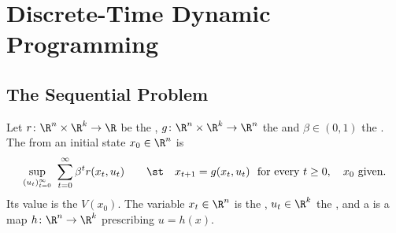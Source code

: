
\chapter{Discrete-Time Dynamic Programming}
\label{ch:dynamic}

\section{The Sequential Problem}\label{sec:dyn-sequential}

\begin{definition}\label{def:sequential-problem}
	Let $r\colon\R^{n}\times\R^{k}\to\R$ be the , $g\colon\R^{n}\times\R^{k}\to\R^{n}$ the  and $\beta\in(0,1)$ the . The 
	from an initial state $x_0\in\R^{n}$ is
	\begin{equation}\label{eq:sequential-problem}
		\sup_{(u_t)_{t=0}^{\infty}}\ \sum_{t=0}^{\infty}\beta^{t}r(x_t,u_t)
		\qquad\st\quad
		x_{t+1}=g(x_t,u_t)\ \text{ for every }t\geq0,\quad x_0\ \text{given}.
	\end{equation}
	Its value is the 
	$V(x_0)$. The variable $x_t\in\R^{n}$ is the , $u_t\in\R^{k}$ the
	, and a  is a map
	$h\colon\R^{n}\to\R^{k}$ prescribing $u=h(x)$.
\end{definition}

